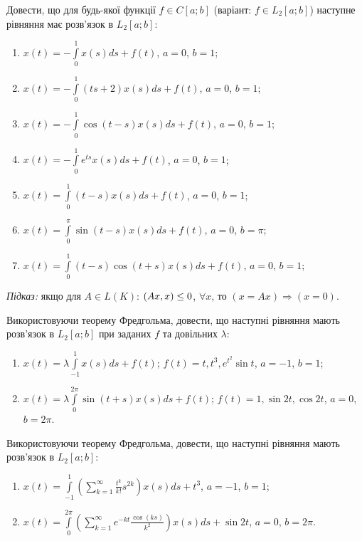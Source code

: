 \begin{exercise}
    Довести, що для будь-якої функції $f \in C[a;b]$ (варіант: $f \in L_2[a;b]$)
    наступне рівняння має розв'язок в $L_2[a;b]$:
    \begin{enumerate}
        \item $x(t) = -\int\limits^1_0 x(s) ds + f(t)$, $a=0$, $b=1$;
        \item $x(t) = -\int\limits^1_0 (ts+2)x(s)ds + f(t)$, $a=0$, $b=1$;
        \item $x(t) = -\int\limits^1_0 \cos(t-s)x(s)ds + f(t)$, $a=0$, $b=1$;
        \item $x(t) = -\int\limits^1_0 e^{ts}x(s)ds + f(t)$, $a=0$, $b=1$;
        \item $x(t) = \int\limits^1_0 (t-s)x(s)ds + f(t)$, $a=0$, $b=1$;
        \item $x(t) = \int\limits^\pi_0 \sin(t-s)x(s)ds + f(t)$, $a=0$, $b=\pi$;
        \item $x(t) = \int\limits^1_0 (t-s)\cos(t+s)x(s)ds + f(t)$, $a=0$, $b=1$;
    \end{enumerate}
\end{exercise}

\begin{theory}
    \textit{Підказ:} якщо для $A\in L(K)$: $\left(Ax, x\right) \leq 0$, $\forall x$,
    то $(x=Ax) \Rightarrow (x=0)$.
\end{theory}

\begin{exercise}
    Використовуючи теорему Фредгольма, довести, що наступні рівняння мають розв'язок в $L_2[a;b]$
    при заданих $f$ та довільних $\lambda$:
    \begin{enumerate}
        \item $x(t) = \lambda \int\limits^1_{-1} x(s) ds + f(t)$;
              $f(t) = t, t^3, e^{t^2}\sin t$, $a=-1$, $b=1$;
        \item $x(t) = \lambda \int\limits^{2\pi}_0 \sin(t+s) x(s) ds + f(t)$; 
              $f(t) = 1, \sin 2t, \cos 2t$, $a=0$, $b=2\pi$.
    \end{enumerate}
\end{exercise}

\begin{exercise}
    Використовуючи теорему Фредгольма, довести, що наступні рівняння мають розв'язок в $L_2[a;b]$:
    \begin{enumerate}
        \item $x(t) = \int\limits^1_{-1} \left(
                \sum\limits^\infty_{k=1} \frac{t^k}{k!} s^{2k}
            \right) x(s) ds + t^3$, $a=-1$, $b=1$;
        \item $x(t) = \int\limits^{2\pi}_0 \left(
                \sum\limits^\infty_{k=1} e^{-kt} \frac{\cos(ks)}{k^2}
            \right) x(s) ds + \sin 2t$, $a=0$, $b=2\pi$.
    \end{enumerate}
\end{exercise}

